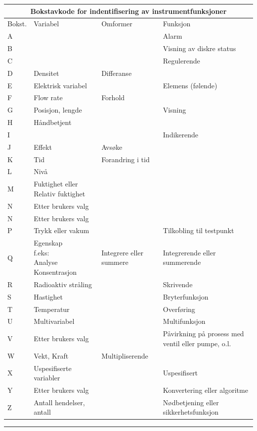 \documentclass[10pt,a5paper]{article}
\begin{document}
\small
\begin{center}
\begin{tabular}{ | m{1cm} | m{2.5cm}| m{2cm} | m{2.5cm} |} 
\hline
\multicolumn{4}{|c|}{Bokstavkode for indentifisering av instrumentfunksjoner} \\
\hline
	Bokst. & Variabel& Omformer & Funksjon \\ 
\hline
	A&&&Alarm\\
\hline
	B&&&Visning av diskre status\\
\hline
	C&&&Regulerende\\
\hline
	D&Densitet&Differanse&\\
\hline
	E&Elektrisk variabel&&Elemens (følende)\\
\hline
	F&Flow rate&Forhold&\\
\hline
	G&Posisjon, lengde&&Visning\\
\hline
	H&Håndbetjent&&\\
	\hline
	I&&&Indikerende\\
	\hline
	J&Effekt&Avsøke&\\
	\hline
	K&Tid&Forandring i tid&\\
	\hline
	L&Nivå&&\\
	\hline
	M&Fuktighet eller Relativ fuktighet&&\\
	\hline
	N&Etter brukers valg&&\\
	\hline
	N&Etter brukers valg&&\\
	\hline
	P&Trykk eller vakum&&Tilkobling til testpunkt\\
	\hline
	Q&\makecell{Egenskap\\f.eks:\\*Analyse\\*Konsentrasjon}&Integrere eller summere&Integrerende eller summerende\\
	\hline
	R&Radioaktiv stråling&&Skrivende\\
	\hline
	S&Hastighet&&Bryterfunksjon\\
	\hline
	T&Temperatur&&Overføring\\
	\hline
	U&Multivariabel&&Multifunksjon\\
	\hline
	V&Etter brukers valg& &Påvirkning på prosess med ventil eller pumpe, o.l.\\
	\hline
	W&Vekt, Kraft&Multipliserende&\\
	\hline
	X&Uspesifiserte variabler&&Uspesifisert\\
	\hline
	Y&Etter brukers valg&&Konvertering eller algoritme\\
	\hline
	Z&Antall hendelser, antall&&Nødbetjening eller sikkerhetsfunksjon\\
\hline
\end{tabular}
\end{center}
\normalsize
\vskip 5pt
\hrule
\end{document}
